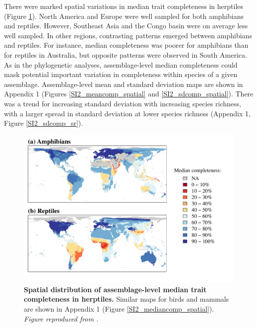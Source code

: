 There were marked spatial variations in median trait completeness in herptiles (Figure \ref{2_Map}). North America and Europe were well sampled for both amphibians and reptiles. However, Southeast Asia and the Congo basin were on average less well sampled. In other regions, contrasting patterns emerged between amphibians and reptiles. For instance, median completeness was poorer for amphibians than for reptiles in Australia, but opposite patterns were observed in South America. As in the phylogenetic analyses, assemblage-level median completeness could mask potential important variation in completeness within species of a given assemblage. Assemblage-level mean and standard deviation maps are shown in Appendix 1 (Figures \ref{SI2_meancomp_spatial} and \ref{SI2_sdcomp_spatial}). There was a trend for increasing standard deviation with increasing species richness, with a larger spread in standard deviation at lower species richness (Appendix 1, Figure \ref{SI2_sdcomp_sr}).

\clearpage

\begin{figure}[h!]
\centering
\includegraphics[scale=0.7]{figures/Chapter2/Figure_5}
\caption[Spatial distribution of assemblage-level median trait completeness in herptiles]{\textbf{Spatial distribution of assemblage-level median trait completeness in herptiles.} Similar maps for birds and mammals are shown in Appendix 1 (Figure \ref{SI2_mediancomp_spatial}). \textit{Figure reproduced from \citet{Etard2020}.}}
\label{2_Map}
\end{figure}


